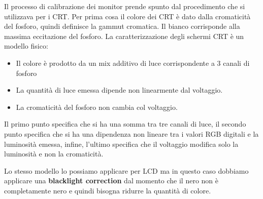 Il processo di calibrazione dei monitor prende spunto dal procedimento che si 
utilizzava per i CRT. Per prima cosa il colore dei CRT è dato dalla cromaticità 
del fosforo, quindi definisce la gammut cromatica. Il bianco corrisponde
alla massima eccitazione del fosforo. La caratterizzazione degli schermi CRT è un
modello fisico:
\begin{itemize}
    \item Il colore è prodotto da un mix additivo di luce corrispondente a 3 canali
          di fosforo
    \item La quantità di luce emessa dipende non linearmente dal voltaggio.
    \item La cromaticità del fosforo non cambia col voltaggio.
\end{itemize}

Il primo punto specifica che si ha una somma tra tre canali di luce, il secondo
punto specifica che si ha una dipendenza non lineare tra i valori RGB digitali e
la luminosità emessa, infine, l'ultimo specifica che il voltaggio modifica solo 
la luminosità e non la cromaticità.

Lo stesso modello lo possiamo applicare per LCD ma in questo caso dobbiamo applicare
una \textbf{blacklight correction} dal momento che il nero non è completamente nero
e quindi bisogna ridurre la quantità di colore.